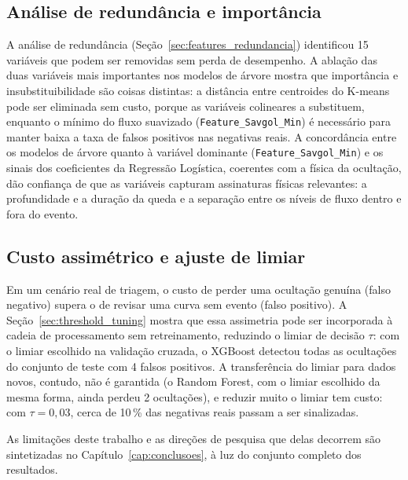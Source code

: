 \subsection{Análise de redundância e importância}

A análise de redundância (Seção~\ref{sec:features_redundancia}) identificou 15 variáveis que podem ser removidas sem perda de desempenho. A ablação das duas variáveis mais importantes nos modelos de árvore mostra que importância e insubstituibilidade são coisas distintas: a distância entre centroides do K-means pode ser eliminada sem custo, porque as variáveis colineares a substituem, enquanto o mínimo do fluxo suavizado (\texttt{Feature\_Savgol\_Min}) é necessário para manter baixa a taxa de falsos positivos nas negativas reais. A concordância entre os modelos de árvore quanto à variável dominante (\texttt{Feature\_Savgol\_Min}) e os sinais dos coeficientes da Regressão Logística, coerentes com a física da ocultação, dão confiança de que as variáveis capturam assinaturas físicas relevantes: a profundidade e a duração da queda e a separação entre os níveis de fluxo dentro e fora do evento.

\subsection{Custo assimétrico e ajuste de limiar}

Em um cenário real de triagem, o custo de perder uma ocultação genuína (falso negativo) supera o de revisar uma curva sem evento (falso positivo). A Seção~\ref{sec:threshold_tuning} mostra que essa assimetria pode ser incorporada à cadeia de processamento sem retreinamento, reduzindo o limiar de decisão $\tau$: com o limiar escolhido na validação cruzada, o XGBoost detectou todas as ocultações do conjunto de teste com 4 falsos positivos. A transferência do limiar para dados novos, contudo, não é garantida (o Random Forest, com o limiar escolhido da mesma forma, ainda perdeu 2 ocultações), e reduzir muito o limiar tem custo: com $\tau = 0{,}03$, cerca de 10\,\% das negativas reais passam a ser sinalizadas.

As limitações deste trabalho e as direções de pesquisa que delas decorrem são sintetizadas no Capítulo~\ref{cap:conclusoes}, à luz do conjunto completo dos resultados.
